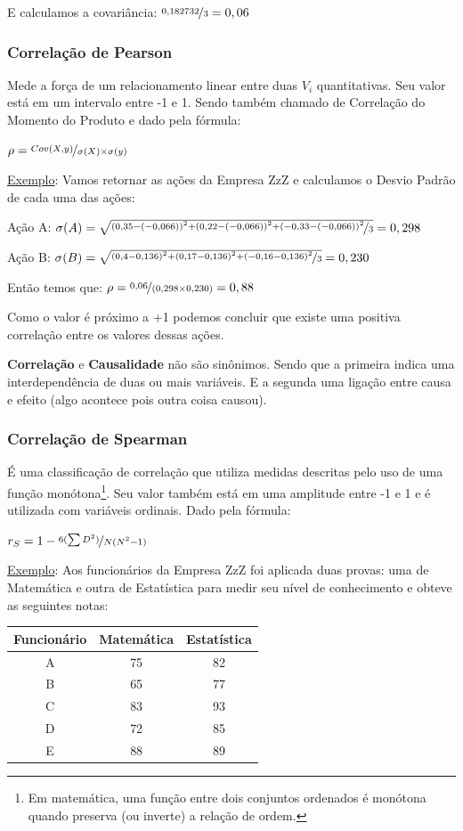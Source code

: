 \documentclass[a4paper,11pt]{article}
\begin{document}
E calculamos a covariância: $\nicefrac{0,182732}{3} = 0,06$

\subsubsection{Correlação de Pearson}
Mede a força de um relacionamento linear entre duas $V_{i}$ quantitativas. Seu valor está em um intervalo entre -1 e 1. Sendo também chamado de Correlação do Momento do Produto e dado pela fórmula:

$\rho = \nicefrac{Cov(X,y)}{\sigma(X) \times \sigma(y)}$

\underline{Exemplo}: Vamos retornar as ações da Empresa ZzZ e calculamos o Desvio Padrão de cada uma das ações:

Ação A: $\sigma(A) = \sqrt{\nicefrac{(0,35 - (-0,066))^2 + (0,22 - (-0,066))^2 + (-0,33 - (-0,066))^2}{3}} = 0,298$

Ação B: $\sigma(B) = \sqrt{\nicefrac{(0,4 - 0,136)^2 + (0,17 - 0,136)^2 + (-0,16 - 0,136)^2}{3}} = 0,230$

Então temos que: $\rho = \nicefrac{0,06}{(0,298 \times 0,230)} = 0,88$

Como o valor é próximo a +1 podemos concluir que existe uma positiva correlação entre os valores dessas ações.

\begin{theo}{}
	\textbf{Correlação} e \textbf{Causalidade} não são sinônimos. Sendo que a primeira indica uma interdependência de duas ou mais variáveis. E a segunda uma ligação entre causa e efeito (algo acontece pois outra coisa causou).
\end{theo}

\subsubsection{Correlação de Spearman}
É uma classificação de correlação que utiliza medidas descritas pelo uso de uma função monótona\footnote{Em matemática, uma função entre dois conjuntos ordenados é monótona quando preserva (ou inverte) a relação de ordem.}. Seu valor também está em uma amplitude entre -1 e 1 e é utilizada com variáveis ordinais. Dado pela fórmula:

$r_S = 1 - \nicefrac{6 (\sum D^2)}{N (N^2-1)}$

\underline{Exemplo}: Aos funcionários da Empresa ZzZ foi aplicada duas provas: uma de Matemática e outra de Estatística para medir seu nível de conhecimento e obteve as seguintes notas:
\begin{table}[H]
	\centering 
	\begin{tabular}{c|c|c}
		\textbf{Funcionário} & \textbf{Matemática} & \textbf{Estatística} \\ \hline
		A & 75 & 82 \\ \hline
		B & 65 & 77 \\ \hline
		C & 83 & 93 \\ \hline
		D & 72 & 85 \\ \hline
		E & 88 & 89
	\end{tabular}
\end{table}
\end{document}
